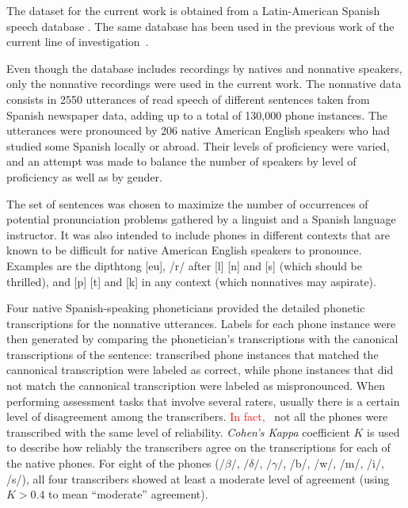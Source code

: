 The dataset for the current work is obtained from a Latin-American Spanish speech database
\cite{database_collection}.  The same database has been used in the previous work of the
current line of \mbox{investigation \cite{main}}.

Even though the database includes recordings by natives and nonnative
speakers, only the nonnative recordings were used in the current work.
The nonnative data consists in 2550 utterances of read speech of different sentences
taken from Spanish newspaper data, adding up to
a total of 130,000 phone instances. The utterances were pronounced by 206 native American English
speakers who had studied some Spanish locally or abroad. Their levels of proficiency were varied,
and an attempt was made to balance the number of speakers by level of proficiency as well as by
gender.

The set of sentences was chosen to maximize the number of
occurrences of potential pronunciation problems gathered by a linguist and a Spanish language
instructor. It was also intended to include phones in different contexts that are known to be
difficult for native American English speakers to pronounce.
Examples are the dipthtong [eu], /r/ after [l] [n] and [s] (which should be
thrilled), and [p] [t] and [k] in any context (which nonnatives may aspirate).

Four native Spanish-speaking phoneticians provided the detailed phonetic transcriptions
for the nonnative utterances. Labels
for each phone instance were then generated by comparing the phonetician's transcriptions with
the canonical transcriptions of the sentence: transcribed phone instances that
matched the cannonical transcription were labeled as correct, while phone instances that did not
match the cannonical transcription were labeled as mispronounced. When performing assessment
tasks that involve several raters, usually there is a certain level of disagreement among the
transcribers. \textcolor{red}{In fact, }
not all the phones were transcribed with the same level of reliability.
\textit{Cohen's Kappa} coefficient $K$ \cite{kappa} is used to describe how reliably the
transcribers agree on the transcriptions for each of the native phones. For eight of the phones
($/\beta/$, $/\delta/$, $/\gamma/$, /b/, /w/, /m/, /i/, /s/), all four transcribers showed at least
a moderate level of agreement (using $K > 0.4$ to mean ``moderate'' agreement).


